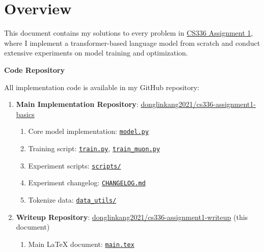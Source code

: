\section{Overview}

This document contains my solutions to every problem in \href{https://github.com/stanford-cs336/assignment1-basics/}{CS336 Assignment 1}, where I implement a transformer-based language model from scratch and conduct extensive experiments on model training and optimization.

\textbf{Code Repository}

All implementation code is available in my GitHub repository:

\begin{enumerate}
    \item \textbf{Main Implementation Repository}: \href{https://github.com/donglinkang2021/cs336-assignment1-basics}{donglinkang2021/cs336-assignment1-basics}
    \begin{enumerate}
        \item Core model implementation: \href{https://github.com/donglinkang2021/cs336-assignment1-basics/blob/main/cs336_basics/model.py}{\lstinline{model.py}}
        \item Training script: \href{https://github.com/donglinkang2021/cs336-assignment1-basics/blob/main/train.py}{\lstinline{train.py}}, \href{https://github.com/donglinkang2021/cs336-assignment1-basics/blob/main/train_muon.py}{\lstinline{train_muon.py}}
        \item Experiment scripts: \href{https://github.com/donglinkang2021/cs336-assignment1-basics/tree/main/scripts}{\lstinline{scripts/}}
        \item Experiment changelog: \href{https://github.com/donglinkang2021/cs336-assignment1-basics/blob/main/docs/CHANGELOG.md}{\lstinline{CHANGELOG.md}}
        \item Tokenize data: \href{https://github.com/donglinkang2021/cs336-assignment1-basics/tree/main/data_utils/}{\lstinline{data_utils/}}
    \end{enumerate}
    \item \textbf{Writeup Repository}: \href{https://github.com/donglinkang2021/cs336-assignment1-writeup}{donglinkang2021/cs336-assignment1-writeup} (this document)
    \begin{enumerate}
        \item Main \LaTeX{} document: \href{https://github.com/donglinkang2021/cs336-assignment1-writeup/blob/main/main.tex}{\lstinline{main.tex}}

\end{enumerate}
\end{enumerate}

